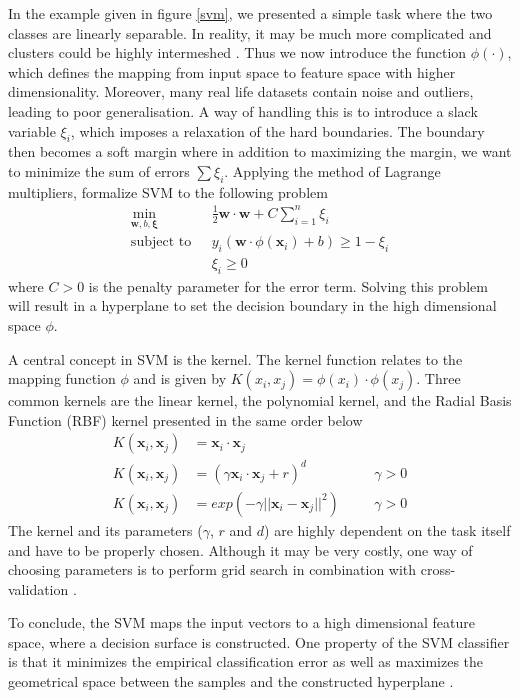 In the example given in figure \ref{svm}, we presented a simple task where the two classes are linearly separable. In reality, it may be much more complicated and clusters could be highly intermeshed \citep{campbell2011}. Thus we now introduce the function $\phi(\cdot)$, which defines the mapping from input space to feature space with higher dimensionality. Moreover, many real life datasets contain noise and outliers, leading to poor generalisation. A way of handling this is to introduce a slack variable $\xi_i$, which imposes a relaxation of the hard boundaries. The boundary then becomes a soft margin where in addition to maximizing the margin, we want to minimize the sum of errors $\sum \xi_i$. Applying the method of Lagrange multipliers, \citet{campbell2011} formalize SVM to the following problem
\begin{align}
    \nonumber
    \min_{\bm{w},b,\bm{\xi}}\text{~~}&\frac{1}{2}\bm{w} \cdot \bm{w}+C\sum_{i=1}^{n} \xi_i \\ 
    \text{subject to~~}&y_i(\bm{w}\cdot \phi(\bm{x}_i)+b)\geq 1-\xi_i \label{svmeq}\\ 
    &\xi_i\geq 0 \nonumber
\end{align}
where $C>0$ is the penalty parameter for the error term. Solving this problem will result in a hyperplane to set the decision boundary in the high dimensional space $\phi$.

A central concept in SVM is the kernel. The kernel function relates to the mapping function $\phi$ and is given by $K(x_i,x_j)=\phi(x_i)\cdot \phi(x_j)$. Three common kernels are the linear kernel, the polynomial kernel, and the Radial Basis Function (RBF) kernel presented in the same order below
\begin{align}
K(\bm{x}_i,\bm{x}_j)&=\bm{x}_i \cdot \bm{x}_j & \nonumber \\ 
K(\bm{x}_i,\bm{x}_j)&=(\gamma \bm{x}_i \cdot \bm{x}_j + r)^d \text{~~~~~}&\gamma>0\\
K(\bm{x}_i,\bm{x}_j)&=exp(-\gamma ||\bm{x}_i-\bm{x}_j||^2) \text{~~~~~}&\gamma>0 \nonumber
\end{align}
The kernel and its parameters ($\gamma$, $r$ and $d$) are highly dependent on the task itself and have to be properly chosen. Although it may be very costly, one way of choosing parameters is to perform grid search in combination with cross-validation \citep{Hsu10apractical}.

To conclude, the SVM maps the input vectors to a high dimensional feature space, where a decision surface is constructed. One property of the SVM classifier is that it minimizes the empirical classification error as well as maximizes the geometrical space between the samples and the constructed hyperplane \citep{Cortes1995}.

